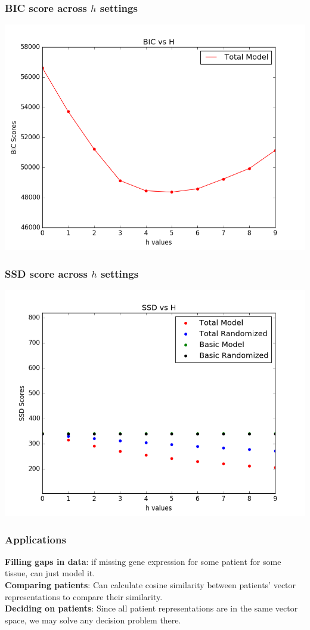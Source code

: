 \documentclass{beamer}
\begin{document}
\begin{frame} \frametitle{BIC score across $h$ settings}
\includegraphics[scale=0.5]{BIC_Scores.png}
\end{frame}


\begin{frame} \frametitle{SSD score across $h$ settings}
\includegraphics[scale=0.5]{SSD_Scores.png}
\end{frame}


\begin{frame} \frametitle{Applications}
{\bf Filling gaps in data}: if missing gene expression for some patient for some tissue, can just model it. \\
{\bf Comparing patients}: Can calculate cosine similarity between patients' vector representations to compare their similarity. \\
{\bf Deciding on patients}: Since all patient representations are in the same vector space, we may solve any decision problem there.
\end{frame}
\end{document}
